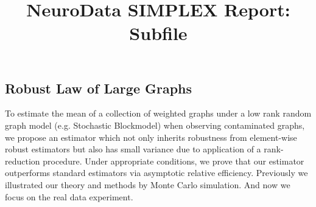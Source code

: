 \documentclass[simplex.tex]{subfiles}
\title{NeuroData SIMPLEX Report: Subfile}
\begin{document}

\subsection{Robust Law of Large Graphs}

To estimate the mean of a collection of weighted graphs under a
low rank random graph model (e.g. Stochastic Blockmodel) when
observing contaminated graphs, we propose an estimator which not
only inherits robustness from element-wise robust estimators but
also has small variance due to application of a rank-reduction
procedure. Under appropriate conditions, we prove that our
estimator outperforms standard estimators via asymptotic relative
efficiency.  Previously we illustrated our theory and methods by Monte
Carlo simulation. And now we focus on the real data experiment.
\end{document}
